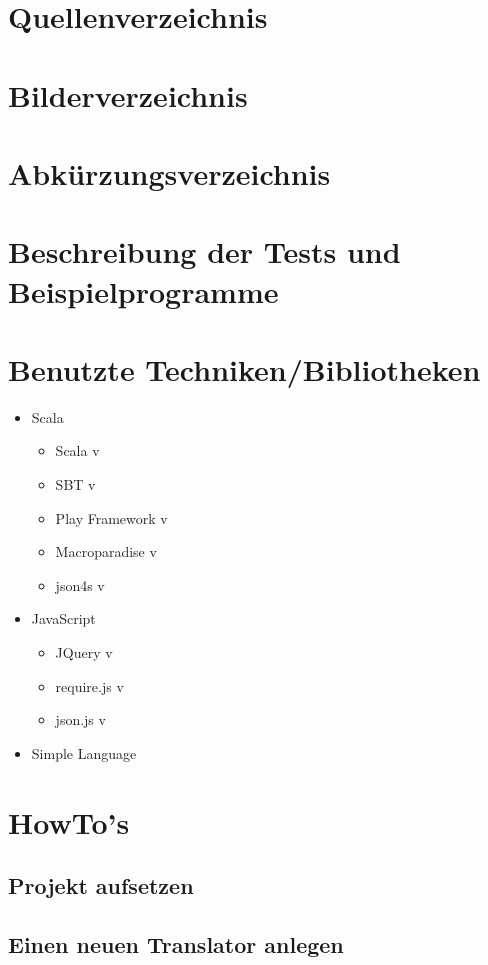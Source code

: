\documentclass[12pt]{scrreprt}
\begin{document}
\section{Quellenverzeichnis}


\section{Bilderverzeichnis}


\section{Abkürzungsverzeichnis}

\begin{acronym}[TU-Berlin]
 \acro{}{}
\end{acronym}


\section{Beschreibung der Tests und Beispielprogramme}


\section{Benutzte Techniken/Bibliotheken}

\begin{itemize}
  \item{Scala}
  \begin{itemize}
    \item{Scala v}
    \item{SBT v}
    \item{Play Framework v}
    \item{Macroparadise v}
    \item{json4s v}
  \end{itemize}
  \item{JavaScript}
  \begin{itemize}
    \item{JQuery v}
    \item{require.js v}
    \item{json.js v}
  \end{itemize}
  \item{Simple Language}
\end{itemize}



\section{HowTo's}
\subsection{Projekt aufsetzen}
\subsection{Einen neuen Translator anlegen}

{}

\end{document}
